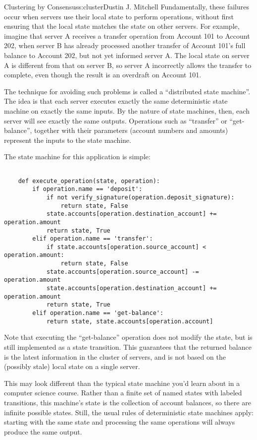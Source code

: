 \begin{aosachapter}{Clustering by Consensus}{s:cluster}{Dustin J. Mitchell}
Fundamentally, these failures occur when servers use their local state
to perform operations, without first ensuring that the local state
matches the state on other servers. For example, imagine that server A
receives a transfer operation from Account 101 to Account 202, when
server B has already processed another transfer of Account 101's full
balance to Account 202, but not yet informed server A. The local state
on server A is different from that on server B, so server A incorrectly
allows the transfer to complete, even though the result is an overdraft
on Account 101.

\label{distributed-state-machines}

The technique for avoiding such problems is called a ``distributed state
machine''. The idea is that each server executes exactly the same
deterministic state machine on exactly the same inputs. By the nature of
state machines, then, each server will see exactly the same outputs.
Operations such as ``transfer'' or ``get-balance'', together with their
parameters (account numbers and amounts) represent the inputs to the
state machine.

The state machine for this application is simple:

\begin{verbatim}

    def execute_operation(state, operation):
        if operation.name == 'deposit':
            if not verify_signature(operation.deposit_signature):
                return state, False
            state.accounts[operation.destination_account] += operation.amount
            return state, True
        elif operation.name == 'transfer':
            if state.accounts[operation.source_account] < operation.amount:
                return state, False
            state.accounts[operation.source_account] -= operation.amount
            state.accounts[operation.destination_account] += operation.amount
            return state, True
        elif operation.name == 'get-balance':
            return state, state.accounts[operation.account]
\end{verbatim}

Note that executing the ``get-balance'' operation does not modify the
state, but is still implemented as a state transition. This guarantees
that the returned balance is the latest information in the cluster of
servers, and is not based on the (possibly stale) local state on a
single server.

This may look different than the typical state machine you'd learn about
in a computer science course. Rather than a finite set of named states
with labeled transitions, this machine's state is the collection of
account balances, so there are infinite possible states. Still, the
usual rules of deterministic state machines apply: starting with the
same state and processing the same operations will always produce the
same output.


\end{aosachapter}
